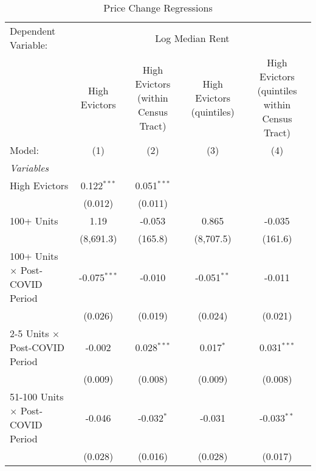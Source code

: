 \begin{table}[htbp]
   \caption{Price Change Regressions}
   \centering
   \begin{tabular}{lcccc}
      \tabularnewline \midrule \midrule
      Dependent Variable: & \multicolumn{4}{c}{Log Median Rent}\\
                                                   & High Evictors  & High Evictors (within Census Tract) & High Evictors (quintiles) & High Evictors (quintiles within Census Tract) \\   
      Model:                                       & (1)            & (2)                                 & (3)                       & (4)\\  
      \midrule
      \emph{Variables}\\
      High Evictors                                & 0.122$^{***}$  & 0.051$^{***}$                       &                           &   \\   
                                                   & (0.012)        & (0.011)                             &                           &   \\   
      100+ Units                                   & 1.19           & -0.053                              & 0.865                     & -0.035\\   
                                                   & (8,691.3)      & (165.8)                             & (8,707.5)                 & (161.6)\\   
      100+ Units $\times$ Post-COVID Period        & -0.075$^{***}$ & -0.010                              & -0.051$^{**}$             & -0.011\\   
                                                   & (0.026)        & (0.019)                             & (0.024)                   & (0.021)\\   
      2-5 Units $\times$ Post-COVID Period         & -0.002         & 0.028$^{***}$                       & 0.017$^{*}$               & 0.031$^{***}$\\   
                                                   & (0.009)        & (0.008)                             & (0.009)                   & (0.008)\\   
      51-100 Units $\times$ Post-COVID Period      & -0.046         & -0.032$^{*}$                        & -0.031                    & -0.033$^{**}$\\   
                                                   & (0.028)        & (0.016)                             & (0.028)                   & (0.017)\\   

\end{tabular}
\end{table}
